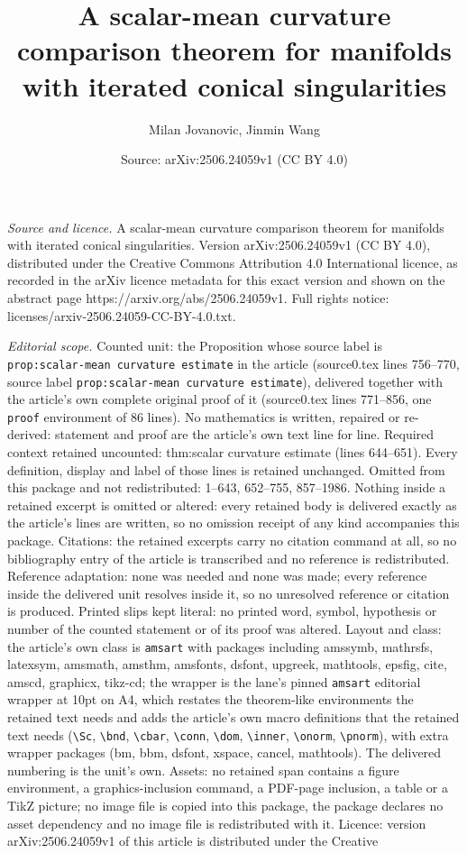 \documentclass[10pt,a4paper]{amsart}
\title[A scalar-mean curvature comparison theorem for manifolds wit]{A scalar-mean curvature comparison theorem for manifolds with iterated conical singularities}
\author{Milan Jovanovic, Jinmin Wang}
\date{Source: arXiv:2506.24059v1 (CC BY 4.0)}
\begin{document}
\maketitle

\noindent\emph{Source and licence.} A scalar-mean curvature comparison theorem for manifolds with iterated conical singularities. Version arXiv:2506.24059v1 (CC BY 4.0), distributed under the Creative Commons Attribution 4.0 International licence, as recorded in the arXiv licence metadata for this exact version and shown on the abstract page https://arxiv.org/abs/2506.24059v1. Full rights notice: licenses/arxiv-2506.24059-CC-BY-4.0.txt.\par\smallskip

\noindent\textit{Editorial scope.} Counted unit: the Proposition whose source label is \texttt{prop:scalar-mean curvature estimate} in the article (source0.tex lines 756--770, source label \texttt{prop:scalar-mean curvature estimate}), delivered together with the article's own complete original proof of it (source0.tex lines 771--856, one \texttt{proof} environment of 86 lines). No mathematics is written, repaired or re-derived: statement and proof are the article's own text line for line. Required context retained uncounted: thm:scalar curvature estimate (lines 644--651). Every definition, display and label of those lines is retained unchanged. Omitted from this package and not redistributed: 1--643, 652--755, 857--1986. Nothing inside a retained excerpt is omitted or altered: every retained body is delivered exactly as the article's lines are written, so no omission receipt of any kind accompanies this package. Citations: the retained excerpts carry no citation command at all, so no bibliography entry of the article is transcribed and no reference is redistributed. Reference adaptation: none was needed and none was made; every reference inside the delivered unit resolves inside it, so no unresolved reference or citation is produced. Printed slips kept literal: no printed word, symbol, hypothesis or number of the counted statement or of its proof was altered. Layout and class: the article's own class is \texttt{amsart} with packages including amssymb, mathrsfs, latexsym, amsmath, amsthm, amsfonts, dsfont, upgreek, mathtools, epsfig, cite, amscd, graphicx, tikz-cd; the wrapper is the lane's pinned \texttt{amsart} editorial wrapper at 10pt on A4, which restates the theorem-like environments the retained text needs and adds the article's own macro definitions that the retained text needs (\texttt{\textbackslash Sc}, \texttt{\textbackslash bnd}, \texttt{\textbackslash cbar}, \texttt{\textbackslash conn}, \texttt{\textbackslash dom}, \texttt{\textbackslash inner}, \texttt{\textbackslash onorm}, \texttt{\textbackslash pnorm}), with extra wrapper packages (bm, bbm, dsfont, xspace, cancel, mathtools). The delivered numbering is the unit's own. Assets: no retained span contains a figure environment, a graphics-inclusion command, a PDF-page inclusion, a table or a TikZ picture; no image file is copied into this package, the package declares no asset dependency and no image file is redistributed with it. Licence: version arXiv:2506.24059v1 of this article is distributed under the Creative 
\end{document}
